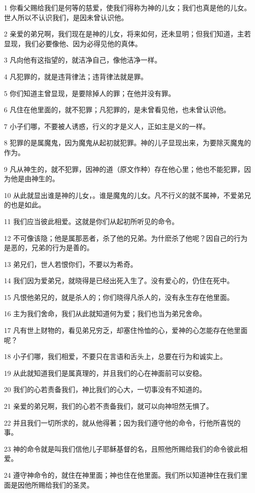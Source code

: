 \par 1 你看父赐给我们是何等的慈爱，使我们得称为神的儿女；我们也真是他的儿女。世人所以不认识我们，是因未曾认识他。
\par 2 亲爱的弟兄啊，我们现在是神的儿女，将来如何，还未显明；但我们知道，主若显现，我们必要像他、因为必得见他的真体。
\par 3 凡向他有这指望的，就洁净自己，像他洁净一样。
\par 4 凡犯罪的，就是违背律法；违背律法就是罪。
\par 5 你们知道主曾显现，是要除掉人的罪；在他并没有罪。
\par 6 凡住在他里面的，就不犯罪；凡犯罪的，是未曾看见他，也未曾认识他。
\par 7 小子们哪，不要被人诱惑，行义的才是义人，正如主是义的一样。
\par 8 犯罪的是属魔鬼，因为魔鬼从起初就犯罪。神的儿子显现出来，为要除灭魔鬼的作为。
\par 9 凡从神生的，就不犯罪，因神的道（原文作种）存在他心里；他也不能犯罪，因为他是由神生的。
\par 10 从此就显出谁是神的儿女，。谁是魔鬼的儿女。凡不行义的就不属神，不爱弟兄的也是如此。
\par 11 我们应当彼此相爱。这就是你们从起初所听见的命令。
\par 12 不可像该隐；他是属那恶者，杀了他的兄弟。为什麽杀了他呢？因自己的行为是恶的，兄弟的行为是善的。
\par 13 弟兄们，世人若恨你们，不要以为希奇。
\par 14 我们因为爱弟兄，就晓得是已经出死入生了。没有爱心的，仍住在死中。
\par 15 凡恨他弟兄的，就是杀人的；你们晓得凡杀人的，没有永生存在他里面。
\par 16 主为我们舍命，我们从此就知道何为爱；我们也当为弟兄舍命。
\par 17 凡有世上财物的，看见弟兄穷乏，却塞住怜恤的心，爱神的心怎能存在他里面呢？
\par 18 小子们哪，我们相爱，不要只在言语和舌头上，总要在行为和诚实上。
\par 19 从此就知道我们是属真理的，并且我们的心在神面前可以安稳。
\par 20 我们的心若责备我们，神比我们的心大，一切事没有不知道的。
\par 21 亲爱的弟兄啊，我们的心若不责备我们，就可以向神坦然无惧了。
\par 22 并且我们一切所求的，就从他得著；因为我们遵守他的命令，行他所喜悦的事。
\par 23 神的命令就是叫我们信他儿子耶稣基督的名，且照他所赐给我们的命令彼此相爱。
\par 24 遵守神命令的，就住在神里面；神也住在他里面。我们所以知道神住在我们里面是因他所赐给我们的圣灵。

